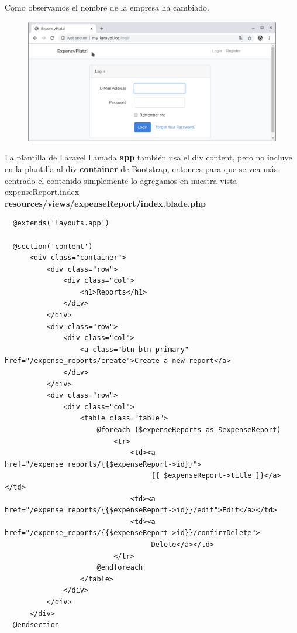 \documentclass{article}
\begin{document}
\newpage

Como observamos el nombre de la empresa ha cambiado.\\

\begin{figure}[h!]
  \centering
  \includegraphics[scale=0.5]{./Pictures/137_app_name.png}
\end{figure}

La plantilla de Laravel llamada \textbf{app} también usa el div content, pero
no incluye en la plantilla al div \textbf{container} de Bootstrap, entonces
para que se vea más centrado el contenido simplemente lo agregamos en nuestra
vista expenseReport.index\\

\textbf{resources/views/expenseReport/index.blade.php}
\begin{verbatim}
  @extends('layouts.app')

  @section('content')
      <div class="container">
          <div class="row">
              <div class="col">
                  <h1>Reports</h1>
              </div>
          </div>
          <div class="row">
              <div class="col">
                  <a class="btn btn-primary" href="/expense_reports/create">Create a new report</a>
              </div>
          </div>
          <div class="row">
              <div class="col">
                  <table class="table">
                      @foreach ($expenseReports as $expenseReport)
                          <tr>
                              <td><a href="/expense_reports/{{$expenseReport->id}}">
                                   {{ $expenseReport->title }}</a></td>
                              <td><a href="/expense_reports/{{$expenseReport->id}}/edit">Edit</a></td>
                              <td><a href="/expense_reports/{{$expenseReport->id}}/confirmDelete">
                                   Delete</a></td>
                          </tr>
                      @endforeach
                  </table>
              </div>
          </div>
      </div>
  @endsection
\end{verbatim}
\end{document}
